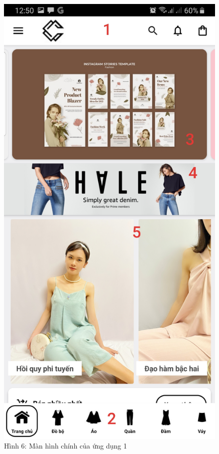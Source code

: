 \documentclass{beamer}
\begin{document}
\begin{frame}
    \begin{columns}
        \begin{figure}
            \centering
            \includegraphics[height=0.7\textheight]{images/06.png}
            \caption{\centering\tiny{Hình 6: Màn hình chính của ứng dụng 1}}


\end{figure}
\end{columns}
\end{frame}
\end{document}
